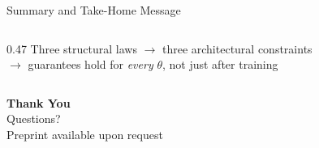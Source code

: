 \documentclass[aspectratio=169, 11pt]{beamer}
\begin{document}
\begin{frame}{Summary and Take-Home Message}
\begin{columns}[T]
\begin{column}{0.47\textwidth}
\vspace{0.2cm}
\centering
\small
{\color{gray} Three structural laws $\to$ three architectural constraints}\\[2pt]
{\color{gray} $\to$ guarantees hold for \emph{every} $\theta$, not just after training}
\end{column}
\end{columns}
\end{frame}

\begin{frame}
\centering
\vspace{1.5cm}
{\Huge \textbf{Thank You}}\\[1cm]
{\Large Questions?}\\[1.5cm]
{\normalsize
Preprint available upon request\\[0.3cm]
}
\end{frame}
\end{document}
